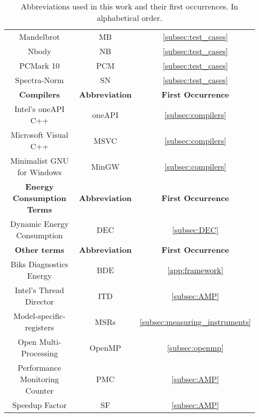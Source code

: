\begin{table}[H]
\begin{tabular}{|| c | c | c ||}
    Mandelbrot& MB & \cref{subsec:test_cases}\\
    Nbody & NB & \cref{subsec:test_cases}\\
    PCMark 10  & PCM & \cref{subsec:test_cases}\\
    Spectra-Norm & SN & \cref{subsec:test_cases}\\
    \hline
    \textbf{Compilers} & \textbf{Abbreviation} & \textbf{First Occurrence} \\\hline
    Intel's oneAPI C++ & oneAPI & \cref{subsec:compilers}\\
    Microsoft Visual C++ & MSVC & \cref{subsec:compilers}\\
    Minimalist GNU for Windows & MinGW & \cref{subsec:compilers}\\
    \hline
    \textbf{Energy Consumption Terms} & \textbf{Abbreviation} & \textbf{First Occurrence} \\\hline
    Dynamic Energy Consumption & DEC &\cref{subsec:DEC}\\
    \hline
    \textbf{Other terms} & \textbf{Abbreviation} & \textbf{First Occurrence} \\\hline
    Biks Diagnostics Energy & BDE & \cref{app:framework}\\
    Intel's Thread Director & ITD & \cref{subsec:AMP}\\
    Model-specific-registers & MSRs &\cref{subsec:measuring_instruments}\\
    Open Multi-Processing & OpenMP &\cref{subsec:openmp}\\
    Performance Monitoring Counter & PMC & \cref{subsec:AMP}\\
    Speedup Factor & SF & \cref{subsec:AMP}\\
    \hline
    \end{tabular}
    \caption{Abbreviations used in this work and their first occurrences. In alphabetical order.}
    \label{tab:abbreviations}
\end{table}